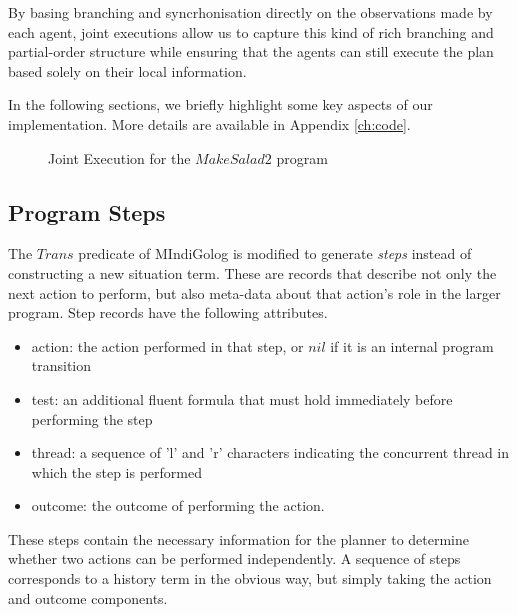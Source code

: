 By basing branching and syncrhonisation directly on the observations
made by each agent, joint executions allow us to capture this kind
of rich branching and partial-order structure while ensuring that
the agents can still execute the plan based solely on their local
information.

In the following sections, we briefly highlight some key aspects of
our implementation. More details are available in Appendix \ref{ch:code}.

%
\begin{figure}[H]

\caption{Joint Execution for the $MakeSalad2$ program}


\label{fig:JE:MakeSalad2-Exec} 
\end{figure}



\subsection{Program Steps}

The $Trans$ predicate of MIndiGolog is modified to generate \emph{steps}
instead of constructing a new situation term. These are records that
describe not only the next action to perform, but also meta-data about
that action's role in the larger program. Step records have the following
attributes.

\begin{itemize}
\item action: the action performed in that step, or $nil$ if it is an internal
program transition 
\item test: an additional fluent formula that must hold immediately before
performing the step 
\item thread: a sequence of 'l' and 'r' characters indicating the concurrent
thread in which the step is performed 
\item outcome: the outcome of performing the action. 
\end{itemize}
These steps contain the necessary information for the planner to determine
whether two actions can be performed independently. A sequence of
steps corresponds to a history term in the obvious way, but simply
taking the action and outcome components.

